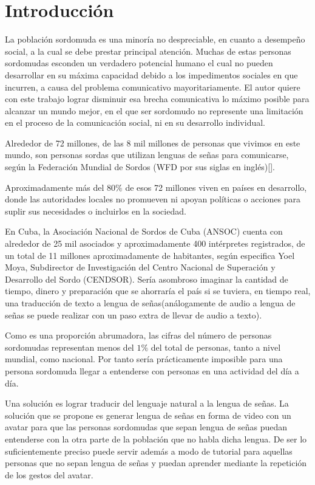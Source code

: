 \chapter*{Introducción}\label{chapter:introduction}

La población sordomuda es una minoría no despreciable, en cuanto a desempeño social, a la cual se debe prestar principal atención. Muchas de estas personas sordomudas esconden un verdadero potencial humano el cual no pueden desarrollar en su máxima capacidad debido a los impedimentos sociales en que incurren, a causa del problema comunicativo mayoritariamente. El autor quiere con este trabajo lograr disminuir esa brecha comunicativa lo máximo posible para alcanzar un mundo mejor, en el que ser sordomudo no represente una limitación en el proceso de la comunicación social, ni en su desarrollo individual.

Alrededor de 72 millones, de las 8 mil millones de personas que vivimos en este mundo, son personas sordas que utilizan lenguas de señas para comunicarse, según la Federación Mundial de Sordos (WFD por sus siglas en inglés)[\cite{without_sign_language_deaf_people_are_not_equal_2019}].

Aproximadamente más del $80\%$ de esos 72 millones viven en países en desarrollo, donde las autoridades locales no promueven ni apoyan políticas o acciones para suplir sus necesidades o incluirlos en la sociedad.

En Cuba, la Asociación Nacional de Sordos de Cuba (ANSOC) cuenta con alrededor de 25 mil asociados y aproximadamente 400 intérpretes registrados, de un total de 11 millones aproximadamente de habitantes, según especifica Yoel Moya, Subdirector de Investigación del Centro Nacional de Superación y Desarrollo del Sordo (CENDSOR). Sería asombroso imaginar la cantidad de tiempo, dinero y preparación que se ahorraría el país si se tuviera, en tiempo real, una traducción de texto a lengua de señas(análogamente de audio a lengua de señas se puede realizar con un paso extra de llevar de audio a texto).

Como es una proporción abrumadora, las cifras del número de personas sordomudas representan menos del $1\%$ del total de personas, tanto a nivel mundial, como nacional. Por tanto sería prácticamente imposible para una persona sordomuda llegar a entenderse con personas en una actividad del día a día.

Una solución es lograr traducir del lenguaje natural a la lengua de señas. La solución que se propone es generar lengua de señas en forma de video con un avatar para que las personas sordomudas que sepan lengua de señas puedan entenderse con la otra parte de la población que no habla dicha lengua. De ser lo suficientemente preciso puede servir además a modo de tutorial para aquellas personas que no sepan lengua de señas y puedan aprender mediante la repetición de los gestos del avatar.



